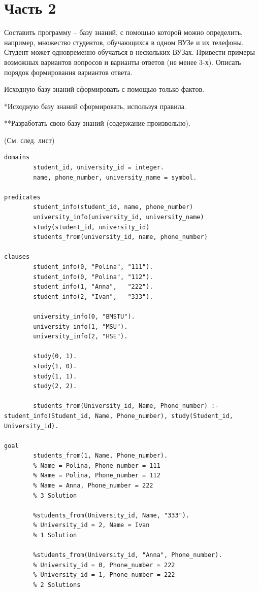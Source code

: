 \documentclass[12pt]{report}
\begin{document}
\section*{Часть 2}

Составить программу – базу знаний, с помощью которой можно определить, например, множество студентов, обучающихся в одном ВУЗе и их телефоны. Студент может одновременно обучаться в нескольких ВУЗах. Привести примеры возможных вариантов вопросов и варианты ответов (не менее 3-х). Описать порядок формирования вариантов
ответа.

Исходную базу знаний сформировать с помощью только фактов.

*Исходную базу знаний сформировать, используя правила.

**Разработать свою базу знаний (содержание произвольно).

(См. след. лист)

\clearpage

\begin{lstlisting}
domains
		student_id, university_id = integer.
		name, phone_number, university_name = symbol.

predicates
		student_info(student_id, name, phone_number)
		university_info(university_id, university_name)
		study(student_id, university_id)
		students_from(university_id, name, phone_number)

clauses
		student_info(0, "Polina", "111").
		student_info(0, "Polina", "112").
		student_info(1, "Anna",   "222").
		student_info(2, "Ivan",   "333").
		
		university_info(0, "BMSTU").
		university_info(1, "MSU").
		university_info(2, "HSE").
		
		study(0, 1).
		study(1, 0).
		study(1, 1).
		study(2, 2).
		
		students_from(University_id, Name, Phone_number) :- student_info(Student_id, Name, Phone_number), study(Student_id, University_id).

goal
		students_from(1, Name, Phone_number).
		% Name = Polina, Phone_number = 111
		% Name = Polina, Phone_number = 112
		% Name = Anna, Phone_number = 222
		% 3 Solution
		
		%students_from(University_id, Name, "333").
		% University_id = 2, Name = Ivan
		% 1 Solution
		
		%students_from(University_id, "Anna", Phone_number).
		% University_id = 0, Phone_number = 222
		% University_id = 1, Phone_number = 222
		% 2 Solutions
\end{lstlisting}
\end{document}
